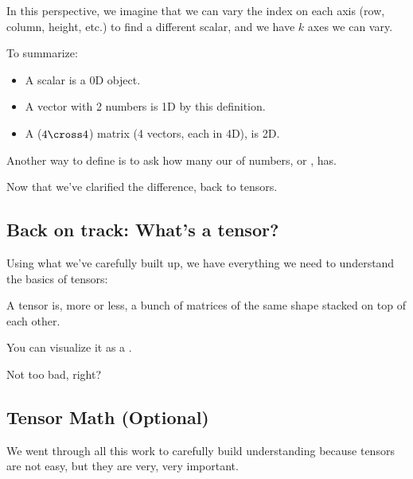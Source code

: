 \begin{itemize}
            In this perspective, we imagine that we can vary the index on each axis (row, column, height, etc.) to find a different scalar, and we have $k$ axes we can vary.
            
            To summarize:
            
            \begin{itemize}
                \item A scalar is a 0D object.
            
                \item A vector with 2 numbers is 1D by this definition. 
                
                \item A ($4 \cross 4$) matrix (4 vectors, each in 4D), is 2D.
            \end{itemize}
            
            \begin{definition}
                Another way to define  is to ask how many  our  of numbers, or , has.
            \end{definition}
            
        \end{itemize}
        
        Now that we've clarified the difference, back to tensors.
        
        
    \subsection{Back on track: What's a tensor?}
    
        Using what we've carefully built up, we have everything we need to understand the basics of tensors:
        
        A tensor is, more or less, a bunch of matrices of the same shape stacked on top of each other. 
        
        You can visualize it as a .
        
        Not too bad, right?
        
    \subsection{Tensor Math (Optional)}
    
        We went through all this work to carefully build understanding because tensors are not easy, but they are very, very important. 
    
